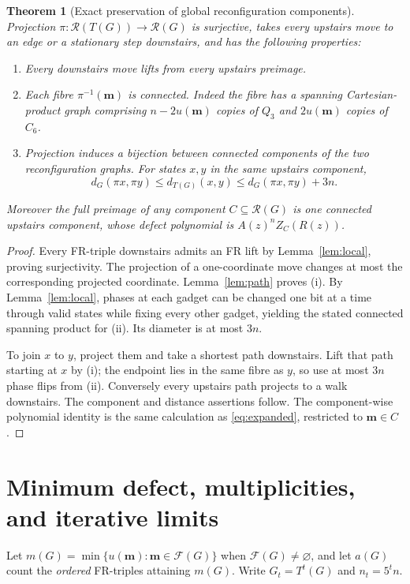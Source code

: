 \documentclass[11pt]{article}
\newtheorem{theorem}{Theorem}
\newcommand{\FR}{\mathcal{F}}
\newcommand{\Rconf}{\mathcal{R}}
\begin{document}
\begin{theorem}[Exact preservation of global reconfiguration components]\label{thm:components}
Projection $\pi:\Rconf(T(G))\to\Rconf(G)$ is surjective, takes every upstairs move to an edge or a stationary step downstairs, and has the following properties:
\begin{enumerate}[label=(\roman*),nosep]
\item Every downstairs move lifts from \emph{every} upstairs preimage.
\item Each fibre $\pi^{-1}(\mathbf m)$ is connected. Indeed the fibre has a spanning Cartesian-product graph comprising $n-2u(\mathbf m)$ copies of $Q_3$ and $2u(\mathbf m)$ copies of $C_6$.
\item Projection induces a bijection between connected components of the two reconfiguration graphs. For states $x,y$ in the same upstairs component,
\[
 d_G(\pi x,\pi y)\le d_{T(G)}(x,y)
 \le d_G(\pi x,\pi y)+3n.
\]
\end{enumerate}
Moreover the full preimage of any component $C\subseteq\Rconf(G)$ is one connected upstairs component, whose defect polynomial is $A(z)^nZ_C(R(z))$.
\end{theorem}
\begin{proof}
Every FR-triple downstairs admits an FR lift by Lemma~\ref{lem:local}, proving surjectivity. The projection of a one-coordinate move changes at most the corresponding projected coordinate. Lemma~\ref{lem:path} proves (i). By Lemma~\ref{lem:local}, phases at each gadget can be changed one bit at a time through valid states while fixing every other gadget, yielding the stated connected spanning product for (ii). Its diameter is at most $3n$.

To join $x$ to $y$, project them and take a shortest path downstairs. Lift that path starting at $x$ by (i); the endpoint lies in the same fibre as $y$, so use at most $3n$ phase flips from (ii). Conversely every upstairs path projects to a walk downstairs. The component and distance assertions follow. The component-wise polynomial identity is the same calculation as \eqref{eq:expanded}, restricted to $\mathbf m\in C$.
\end{proof}

\section{Minimum defect, multiplicities, and iterative limits}
Let $m(G)=\min\{u(\mathbf m):\mathbf m\in\FR(G)\}$ when $\FR(G)\ne\varnothing$, and let $a(G)$ count the \emph{ordered} FR-triples attaining $m(G)$. Write $G_t=T^t(G)$ and $n_t=5^tn$.
\end{document}
